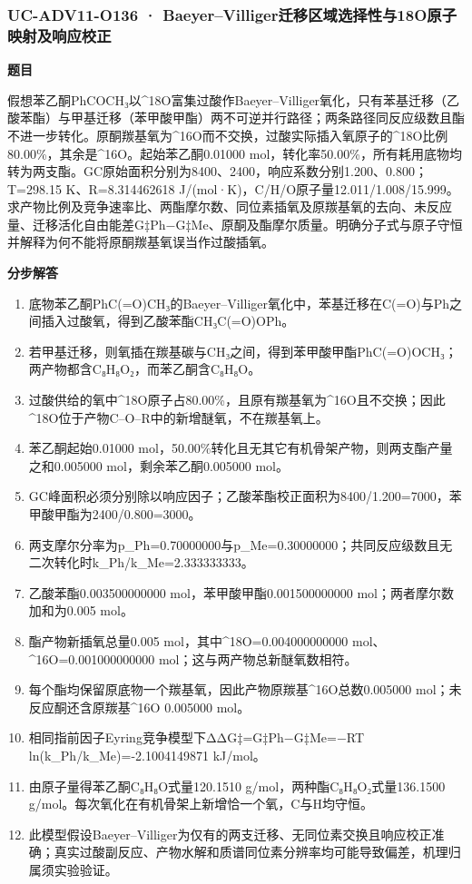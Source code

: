 \documentclass[UTF8,11pt,a4paper]{ctexart}
\begin{document}
\subsubsection*{UC-ADV11-O136 · Baeyer–Villiger迁移区域选择性与18O原子映射及响应校正}
\noindent\textbf{题目}\par
假想苯乙酮PhCOCH₃以\textasciicircum{}18O富集过酸作Baeyer–Villiger氧化，只有苯基迁移（乙酸苯酯）与甲基迁移（苯甲酸甲酯）两不可逆并行路径；两条路径同反应级数且酯不进一步转化。原酮羰基氧为\textasciicircum{}16O而不交换，过酸实际插入氧原子的\textasciicircum{}18O比例80.00\%，其余是\textasciicircum{}16O。起始苯乙酮0.01000 mol，转化率50.00\%，所有耗用底物均转为两支酯。GC原始面积分别为8400、2400，响应系数分别1.200、0.800；T=298.15 K、R=8.314462618 J/(mol·K)，C/H/O原子量12.011/1.008/15.999。求产物比例及竞争速率比、两酯摩尔数、同位素插氧及原羰基氧的去向、未反应量、迁移活化自由能差G‡Ph−G‡Me、原酮及酯摩尔质量。明确分子式与原子守恒并解释为何不能将原酮羰基氧误当作过酸插氧。\par
\medskip\noindent\textbf{分步解答}
\begin{enumerate}
\item 底物苯乙酮PhC(=O)CH₃的Baeyer–Villiger氧化中，苯基迁移在C(=O)与Ph之间插入过酸氧，得到乙酸苯酯CH₃C(=O)OPh。
\item 若甲基迁移，则氧插在羰基碳与CH₃之间，得到苯甲酸甲酯PhC(=O)OCH₃；两产物都含C₈H₈O₂，而苯乙酮含C₈H₈O。
\item 过酸供给的氧中\textasciicircum{}18O原子占80.00\%，且原有羰基氧为\textasciicircum{}16O且不交换；因此\textasciicircum{}18O位于产物C–O–R中的新增醚氧，不在羰基氧上。
\item 苯乙酮起始0.01000 mol，50.00\%转化且无其它有机骨架产物，则两支酯产量之和0.005000 mol，剩余苯乙酮0.005000 mol。
\item GC峰面积必须分别除以响应因子；乙酸苯酯校正面积为8400/1.200=7000，苯甲酸甲酯为2400/0.800=3000。
\item 两支摩尔分率为p\_Ph=0.70000000与p\_Me=0.30000000；共同反应级数且无二次转化时k\_Ph/k\_Me=2.333333333。
\item 乙酸苯酯0.003500000000 mol，苯甲酸甲酯0.001500000000 mol；两者摩尔数加和为0.005 mol。
\item 酯产物新插氧总量0.005 mol，其中\textasciicircum{}18O=0.004000000000 mol、\textasciicircum{}16O=0.001000000000 mol；这与两产物总新醚氧数相符。
\item 每个酯均保留原底物一个羰基氧，因此产物原羰基\textasciicircum{}16O总数0.005000 mol；未反应酮还含原羰基\textasciicircum{}16O 0.005000 mol。
\item 相同指前因子Eyring竞争模型下ΔΔG‡=G‡Ph−G‡Me=−RT ln(k\_Ph/k\_Me)=-2.1004149871 kJ/mol。
\item 由原子量得苯乙酮C₈H₈O式量120.1510 g/mol，两种酯C₈H₈O₂式量136.1500 g/mol。每次氧化在有机骨架上新增恰一个氧，C与H均守恒。
\item 此模型假设Baeyer–Villiger为仅有的两支迁移、无同位素交换且响应校正准确；真实过酸副反应、产物水解和质谱同位素分辨率均可能导致偏差，机理归属须实验验证。
\end{enumerate}
\end{document}

